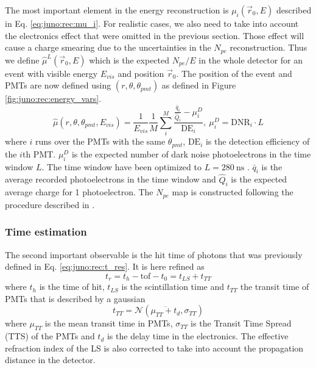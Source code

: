 \documentclass[../main.tex]{subfiles}
\begin{document}
The most important element in the energy reconstruction is $\mu_i(\vec{r}_0, E)$ described in Eq. \ref{eq:juno:rec:mu_i}. For realistic cases, we also need to take into account the electronics effect that were omitted in the previous section. Those effect will cause a charge smearing due to the uncertainties in the $N_{pe}$ reconstruction. Thus we define $\hat{\mu}^L(\vec{r}_0, E)$ which is the expected $N_{pe}/E$ in the whole detector for an event with visible energy $E_{vis}$ and position $\vec{r}_0$. The position of the event and PMTs are now defined using $(r, \theta, \theta_{pmt})$ as defined in Figure \ref{fig:juno:rec:energy_vars}.
\begin{equation}
  \label{eq:juno:reco:charge_est}
  \hat{\mu}(r, \theta, \theta_{pmt}, E_{vis}) = \frac{1}{E_{vis}} \frac{1}{M} \sum_i^M\frac{\frac{\bar{q}_i}{\hat{Q}_i} - \mu_i^D}{\mathrm{DE}_i}, ~ \mu_i^D = \mathrm{DNR}_i \cdot L
\end{equation}
where $i$ runs over the PMTs with the same $\theta_{pmt}$, $\mathrm{DE}_i$ is the detection efficiency of the $i$th PMT. $\mu_i^D$ is the expected number of dark noise photoelectrons in the time window $L$. The time window have been optimized to $L = 280 ~ \mathrm{ns}$ \cite{huang_data-driven_2023}. $\bar{q}_i$ is the average recorded photoelectrons in the time window and $\hat{Q}_i$ is the expected average charge for 1 photoelectron. The $N_{pe}$ map is constructed following the procedure described in \cite{huang_improving_2021}.

\subsubsection{Time estimation}

The second important observable is the hit time of photons that was previously defined in Eq. \ref{eq:juno:rec:t_res}. It is here refined as
\begin{equation}
  t_r = t_h - \mathrm{tof} - t_0 = t_{LS} + t_{TT}
\end{equation}
where $t_h$ is the time of hit, $t_{LS}$ is the scintillation time and $t_{TT}$ the transit time of PMTs that is described by a gaussian
\begin{equation}
  t_{TT} = \mathcal{N}(\overline{\mu_{TT} + t_{d}}, \sigma_{TT})
\end{equation}
where $\mu_{TT}$ is the mean transit time in PMTs, $\sigma_{TT}$ is the Transit Time Spread (TTS) of the PMTs and $t_{d}$ is the delay time in the electronics. The effective refraction index of the LS is also corrected to take into account the propagation distance in the detector.
\end{document}
